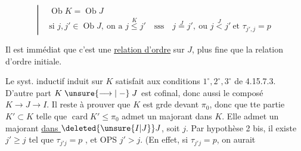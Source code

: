 %
%
\[\left|\begin{aligned}&\operatorname{Ob}K=\operatorname{Ob}J\\ &\text{si }j,j'\in\operatorname{Ob}J,\ \text{on a } j\overset{K}{\leq}j'\quad\text{sss}\quad j\overset{J}{=}j',\ \text{ou }j\overset{J}{<}j'\ \text{et }\tau_{j',j}=p\end{aligned}\right.\]

Il est immédiat que c'est une \uline{relation d'ordre} sur $J$, plus fine que la relation d'ordre initiale.






\deleted{\[\begin{aligned}\tau_{j'i}&=\tau_{j'j}\tau_{ji}={}&\tau_{j'j}p\\ &&\Vert\ \text{par }1^\circ\\ &&p\tau_{j'j}\end{aligned}\]}


Le syst. inductif induit sur $K$ satisfait aux conditions $1^\circ,2^\circ,3^\circ$ de 4.15.7.3.  D'autre part $K\mathrel{\unsure{\longrightarrow|\relbar}}J$ est cofinal, donc aussi le composé $K\longrightarrow J\longrightarrow I$. Il reste à prouver que $K$ est grde devant $\pi_0$, donc que tte partie $K'\subset K$ telle que $\operatorname{card}K'\leq\pi_0$ admet un majorant dans $K$. Elle admet un majorant \uline{dans $\deleted{\unsure{I|J}}J$}, soit $j$. Par hypothèse 2 bis, il existe $j'\geq j$ tel que $\tau_{j'j}=p$ , et OPS $j'>j$.  (En effet, si $\tau_{j'j}=p$, on aurait 
